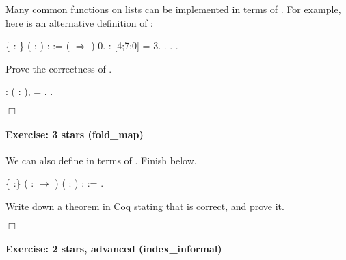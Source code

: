 \documentclass[12pt]{report}
\begin{document}
 Many common functions on lists can be implemented in terms of
   .  For example, here is an alternative definition of : \begin{coqdoccode}
\coqdocemptyline
\coqdocnoindent
{}  \{ : \} ( :  ) :  :=\coqdoceol
\coqdocindent{1.00em}
 ( \coqdocvar{\_}  \ensuremath{\Rightarrow}  )  0.\coqdoceol
\coqdocemptyline
\coqdocnoindent
{}  :  [4;7;0] = 3.\coqdoceol
\coqdocnoindent
{}. . .\coqdoceol
\coqdocemptyline
\end{coqdoccode}
Prove the correctness of . \begin{coqdoccode}
\coqdocemptyline
\coqdocnoindent
{}  : \coqdockw{\ensuremath{\forall}}  ( :  ),\coqdoceol
\coqdocindent{1.00em}
  =  .\coqdoceol
 .\coqdoceol
\end{coqdoccode}
\ensuremath{\Box} 

\paragraph{Exercise: 3 stars (fold\_map)}

 We can also define  in terms of .  Finish 
    below. \begin{coqdoccode}
\coqdocemptyline
\coqdocnoindent
{}  \{ :\} ( :  \ensuremath{\rightarrow} ) ( :  ) :   :=\coqdoceol
\coqdocnoindent
 .\coqdoceol
\coqdocemptyline
\end{coqdoccode}
Write down a theorem  in Coq stating that
    is correct, and prove it. \begin{coqdoccode}
\coqdocemptyline
\end{coqdoccode}
\ensuremath{\Box} 

\paragraph{Exercise: 2 stars, advanced (index\_informal)}
\end{document}
